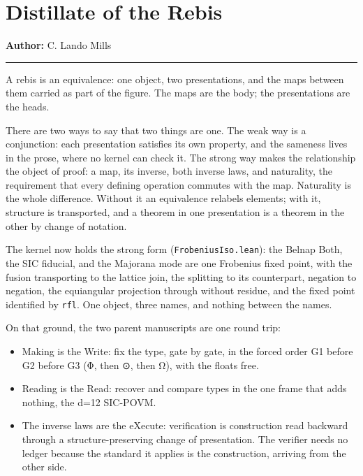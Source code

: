 \hypertarget{distillate-of-the-rebis}{%
\section{Distillate of the Rebis}\label{distillate-of-the-rebis}}

\textbf{Author:} C. Lando Mills

\begin{center}\rule{0.5\linewidth}{0.5pt}\end{center}

A rebis is an equivalence: one object, two presentations, and the maps
between them carried as part of the figure. The maps are the body; the
presentations are the heads.

There are two ways to say that two things are one. The weak way is a
conjunction: each presentation satisfies its own property, and the
sameness lives in the prose, where no kernel can check it. The strong
way makes the relationship the object of proof: a map, its inverse, both
inverse laws, and naturality, the requirement that every defining
operation commutes with the map. Naturality is the whole difference.
Without it an equivalence relabels elements; with it, structure is
transported, and a theorem in one presentation is a theorem in the other
by change of notation.

The kernel now holds the strong form (\texttt{FrobeniusIso.lean}): the
Belnap Both, the SIC fiducial, and the Majorana mode are one Frobenius
fixed point, with the fusion transporting to the lattice join, the
splitting to its counterpart, negation to negation, the equiangular
projection through without residue, and the fixed point identified by
\texttt{rfl}. One object, three names, and nothing between the names.

On that ground, the two parent manuscripts are one round trip:

\begin{itemize}
\tightlist
\item
  Making is the Write: fix the type, gate by gate, in the forced order
  G1 before G2 before G3 (Φ, then ⊙, then Ω), with the floats free.
\item
  Reading is the Read: recover and compare types in the one frame that
  adds nothing, the d=12 SIC-POVM.
\item
  The inverse laws are the eXecute: verification is construction read
  backward through a structure-preserving change of presentation. The
  verifier needs no ledger because the standard it applies is the
  construction, arriving from the other side.
\end{itemize}


